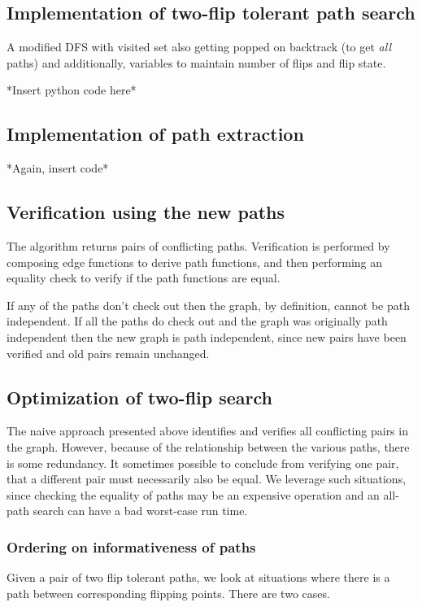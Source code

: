 \documentclass{article}
\begin{document}
\subsection{Implementation of two-flip tolerant path search}
A modified DFS with visited set also getting popped on backtrack (to get \textit{all} paths) and additionally, variables to maintain number of flips and flip state.

*Insert python code here*

\subsection{Implementation of path extraction}
 *Again, insert code*

\subsection{Verification using the new paths}
The algorithm returns pairs of conflicting paths. Verification is performed by composing edge functions to derive path functions, and then performing an equality check to verify if the path functions are equal.

If any of the paths don't check out then the graph, by definition, cannot be path independent. If all the paths do check out and the graph was originally path independent then the new graph is path independent, since new pairs have been verified and old pairs remain unchanged.

\subsection{Optimization of two-flip search}

The naive approach presented above identifies and verifies all conflicting pairs in the graph. However, because of the relationship between the various paths, there is some redundancy. It sometimes possible to conclude from verifying one pair, that a different pair must necessarily also be equal. We leverage such situations, since checking the equality of paths may be an expensive operation and an all-path search can have a bad worst-case run time. 

\subsubsection{Ordering on informativeness of paths}

Given a pair of two flip tolerant paths, we look at situations where there is a path between corresponding flipping points.
There are two cases.
\end{document}
